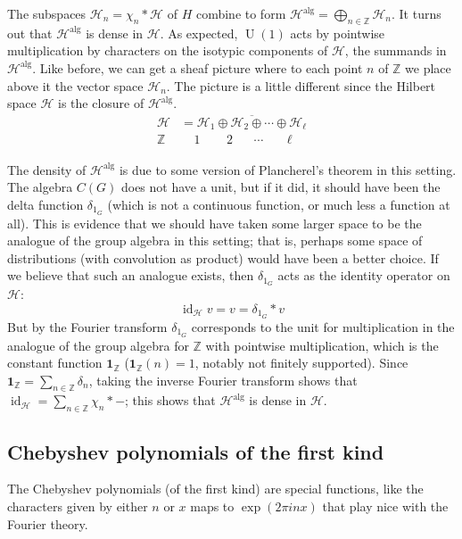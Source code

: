 \documentclass[11pt,leqno]{article}
\theoremstyle{plain}
\theoremstyle{definition}
\numberwithin{equation}{section}
\numberwithin{lem}{section}
\DeclareMathOperator{\id}{id}
\DeclareMathOperator{\U}{U}
\begin{document}
The subspaces $\mathcal H_n = \chi_n\ast \mathcal H$ of $H$ combine to form $\mathcal H^{\textrm{alg}} = \bigoplus_{n\in\mathbb Z}\mathcal H_n$. It turns out that $\mathcal H^{\textrm{alg}}$ is dense in $\mathcal H$. As expected, $\U(1)$ acts by pointwise multiplication by characters on the isotypic components of $\mathcal H$, the summands in $\mathcal H^{\textrm{alg}}$. Like before, we can get a sheaf picture where to each point $n$ of $\mathbb Z$ we place above it the vector space $\mathcal H_n$. The picture is a little different since the Hilbert space $\mathcal H$ is the closure of $\mathcal H^{\textrm{alg}}$.
\begin{align*}
  \mathcal H &= \overline{\mathcal H_1 \oplus \mathcal H_2 \oplus \cdots \oplus \mathcal H_\ell}\\
  \mathbb Z&~~~~~1~~\phantom{\oplus}~~2~~\phantom{\oplus} \cdots \phantom{\oplus}~\,\ell
\end{align*}

The density of $\mathcal H^{\textrm{alg}}$ is due to some version of Plancherel's theorem in this setting. The algebra $C(G)$ does not have a unit, but if it did, it should have been the delta function $\delta_{1_G}$ (which is not a continuous function, or much less a function at all). This is evidence that we should have taken some larger space to be the analogue of the group algebra in this setting; that is, perhaps some space of distributions (with convolution as product) would have been a better choice. If we believe that such an analogue exists, then $\delta_{1_G}$ acts as the identity operator on $\mathcal H$:
\[\id_{\mathcal H}v = v = \delta_{1_G}\ast v\]
But by the Fourier transform $\delta_{1_G}$ corresponds to the unit for multiplication in the analogue of the group algebra for $\mathbb Z$ with pointwise multiplication, which is the constant function $\mathbf 1_{\mathbb Z}$ ($\mathbf 1_{\mathbb Z}(n) = 1$, notably not finitely supported). Since $\mathbf 1_{\mathbb Z} = \sum_{n\in\mathbb Z}\delta_n$, taking the inverse Fourier transform shows that $\id_{\mathcal H} = \sum_{n\in\mathbb Z}\chi_n\ast -$; this shows that $\mathcal H^{\textrm{alg}}$ is dense in $\mathcal H$.

\subsection{Chebyshev polynomials of the first kind}
The Chebyshev polynomials (of the first kind) are special functions, like the characters given by either $n$ or $x$ maps to $\exp(2\pi i nx)$ that play nice with the Fourier theory.
\end{document}
